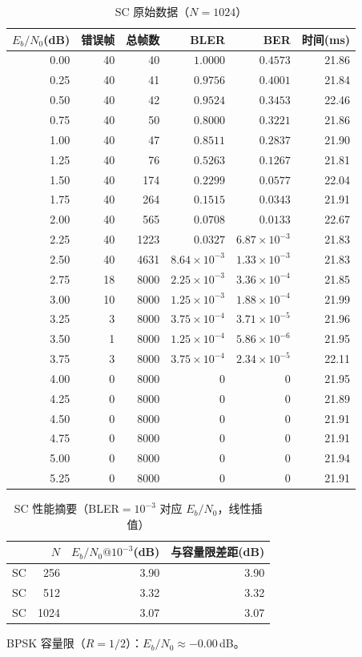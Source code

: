 \documentclass[12pt, a4paper]{article}
\begin{document}
\begin{table}[H]
\centering\caption{SC 原始数据（$N=1024$）}\small
\begin{tabular}{rrrrrr}
\toprule
$E_b/N_0$(dB) & 错误帧 & 总帧数 & BLER & BER & 时间(ms) \\
\midrule
0.00 & 40 & 40 & $1.0000$ & $0.4573$ & 21.86 \\
0.25 & 40 & 41 & $0.9756$ & $0.4001$ & 21.84 \\
0.50 & 40 & 42 & $0.9524$ & $0.3453$ & 22.46 \\
0.75 & 40 & 50 & $0.8000$ & $0.3221$ & 21.86 \\
1.00 & 40 & 47 & $0.8511$ & $0.2837$ & 21.90 \\
1.25 & 40 & 76 & $0.5263$ & $0.1267$ & 21.81 \\
1.50 & 40 & 174 & $0.2299$ & $0.0577$ & 22.04 \\
1.75 & 40 & 264 & $0.1515$ & $0.0343$ & 21.91 \\
2.00 & 40 & 565 & $0.0708$ & $0.0133$ & 22.67 \\
2.25 & 40 & 1223 & $0.0327$ & $6.87\times10^{-3}$ & 21.83 \\
2.50 & 40 & 4631 & $8.64\times10^{-3}$ & $1.33\times10^{-3}$ & 21.83 \\
2.75 & 18 & 8000 & $2.25\times10^{-3}$ & $3.36\times10^{-4}$ & 21.85 \\
3.00 & 10 & 8000 & $1.25\times10^{-3}$ & $1.88\times10^{-4}$ & 21.99 \\
3.25 & 3 & 8000 & $3.75\times10^{-4}$ & $3.71\times10^{-5}$ & 21.96 \\
3.50 & 1 & 8000 & $1.25\times10^{-4}$ & $5.86\times10^{-6}$ & 21.95 \\
3.75 & 3 & 8000 & $3.75\times10^{-4}$ & $2.34\times10^{-5}$ & 22.11 \\
4.00 & 0 & 8000 & $0$ & $0$ & 21.95 \\
4.25 & 0 & 8000 & $0$ & $0$ & 21.89 \\
4.50 & 0 & 8000 & $0$ & $0$ & 21.91 \\
4.75 & 0 & 8000 & $0$ & $0$ & 21.91 \\
5.00 & 0 & 8000 & $0$ & $0$ & 21.94 \\
5.25 & 0 & 8000 & $0$ & $0$ & 21.91 \\
\bottomrule
\end{tabular}
\end{table}

\begin{table}[H]
\centering
\caption{SC 性能摘要（BLER$=10^{-3}$ 对应 $E_b/N_0$，线性插值）}
\begin{tabular}{lrrr}
\toprule
 & $N$ & $E_b/N_0@10^{-3}$(dB) & 与容量限差距(dB) \\
\midrule
SC & 256  & 3.90 & 3.90 \\
SC & 512  & 3.32 & 3.32 \\
SC & 1024 & 3.07 & 3.07 \\
\bottomrule
\end{tabular}
\end{table}
BPSK 容量限（$R=1/2$）：$E_b/N_0 \approx -0.00$\,dB。
\end{document}
